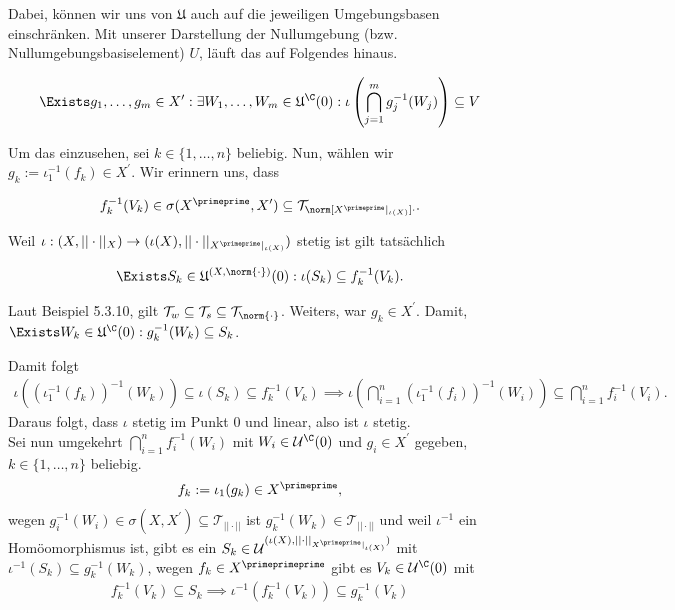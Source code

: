 \begin{solution}
\begin{enumerate}[label = (\arabic*)]
  Dabei, können wir uns von $\mathfrak{U}$ auch auf die jeweiligen Umgebungsbasen einschränken.
  Mit unserer Darstellung der Nullumgebung (bzw. Nullumgebungsbasiselement) $U$, läuft das auf Folgendes hinaus.

  \begin{align*}
    \Exists g_1, \dots, g_m \in X^{\prime}:
    \exists W_1, \dots, W_m \in \mathfrak{U}^\C(0):
    \iota\left(\bigcap_{j=1}^m g_j^{-1}(W_j)\right) \subseteq V
  \end{align*}

  Um das einzusehen, sei $k \in \{1,\dots,n\}$ beliebig.
  Nun, wählen wir $g_k := \iota_1^{-1}(f_k) \in X^{\prime}$.
  Wir erinnern uns, dass

  \begin{align*}
    f_k^{-1}(V_k)
    \in
    \sigma(X^{\primeprime}, X^{\prime})
    \subseteq
    \mathcal{T}_{\norm[X^\primeprime|_{\iota(X)}]{\cdot}}.
  \end{align*}

  Weil $\iota: (X,||\cdot||_X) \rightarrow (\iota(X),||\cdot||_{X^{\primeprime}|_{\iota(X)}})$
  stetig ist gilt tatsächlich

  \begin{align*}
    \Exists S_k \in \mathfrak{U}^{(X,\norm{\cdot})}(0):
    \iota(S_k) \subseteq f_k^{-1}(V_k).
  \end{align*}

  Laut Beispiel 5.3.10, gilt $\mathcal{T}_w \subseteq \mathcal{T}_s \subseteq \mathcal{T}_{\norm{\cdot}}$.
  Weiters, war $g_k \in X^\prime$. Damit, $\Exists W_k \in \mathfrak{U}^\C(0): g_k^{-1}(W_k) \subseteq S_k$.

  Damit folgt
  \begin{align*}
    \iota((\iota_1^{-1}(f_k))^{-1}(W_k)) \subseteq \iota(S_k) \subseteq f_k^{-1}(V_k)
    \implies \iota\left(\bigcap_{i=1}^n (\iota_1^{-1}(f_i))^{-1}(W_i)\right) \subseteq \bigcap_{i = 1}^nf_i^{-1}(V_i).
  \end{align*}
  Daraus folgt, dass $\iota$ stetig im Punkt $0$ und linear, also ist $\iota$ stetig. \\
  Sei nun umgekehrt $\bigcap_{i=1}^n f_i^{-1}(W_i)$ mit $W_i \in \mathcal{U}^{\C}(0)$
  und $g_i \in X^{\prime}$ gegeben, $k \in \{1,\dots,n\}$ beliebig.
  \begin{align*}
    f_k := \iota_1(g_k) \in X^{\primeprime},
  \end{align*}
  wegen $g_i^{-1}(W_i) \in \sigma(X,X^{\prime}) \subseteq \mathcal{T}_{||\cdot||}$
  ist $g_k^{-1}(W_k) \in \mathcal{T}_{||\cdot||}$ und weil $\iota^{-1}$ ein
  Homöomorphismus ist, gibt es ein
  $S_k \in \mathcal{U}^{(\iota(X), ||\cdot||_{X^{\primeprime}|_{\iota(X)}})}$
  mit $\iota^{-1}(S_k) \subseteq g_k^{-1}(W_k)$, wegen $f_k \in X^{\primeprimeprime}$
  gibt es $V_k \in \mathcal{U}^{\C}(0)$ mit
  \begin{align*}
    f_k^{-1}(V_k) \subseteq S_k \implies \iota^{-1}(f_k^{-1}(V_k)) \subseteq g_k^{-1}(V_k)
  \end{align*}


\end{enumerate}
\end{solution}
